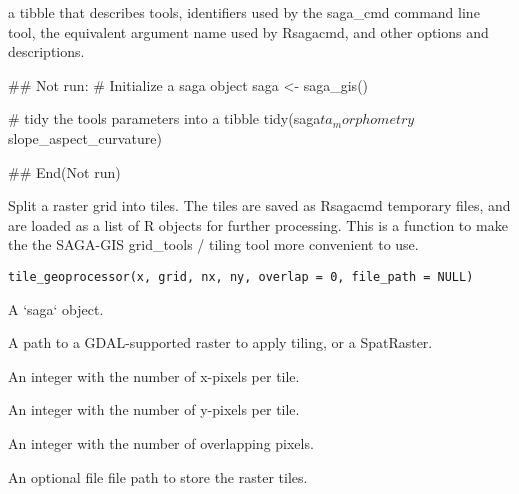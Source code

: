 \documentclass[a4paper]{book}
\begin{document}
%
\begin{Value}
a tibble that describes tools, identifiers used by the saga\_cmd
command line tool, the equivalent argument name used by Rsagacmd, and other
options and descriptions.
\end{Value}
%
\begin{Examples}
\begin{ExampleCode}
## Not run: 
# Initialize a saga object
saga <- saga_gis()

# tidy the tools parameters into a tibble
tidy(saga$ta_morphometry$slope_aspect_curvature)

## End(Not run)
\end{ExampleCode}
\end{Examples}
%
\begin{Description}
Split a raster grid into tiles. The tiles are saved as Rsagacmd
temporary files, and are loaded as a list of R objects for further
processing. This is a function to make the the SAGA-GIS
grid\_tools / tiling tool more convenient to use.
\end{Description}
%
\begin{Usage}
\begin{verbatim}
tile_geoprocessor(x, grid, nx, ny, overlap = 0, file_path = NULL)
\end{verbatim}
\end{Usage}
%
\begin{Arguments}
\begin{ldescription}
\item[\code{x}] A `saga` object.

\item[\code{grid}] A path to a GDAL-supported raster to apply tiling, or a
SpatRaster.

\item[\code{nx}] An integer with the number of x-pixels per tile.

\item[\code{ny}] An integer with the number of y-pixels per tile.

\item[\code{overlap}] An integer with the number of overlapping pixels.

\item[\code{file\_path}] An optional file file path to store the raster tiles.
\end{ldescription}
\end{Arguments}
\end{document}
